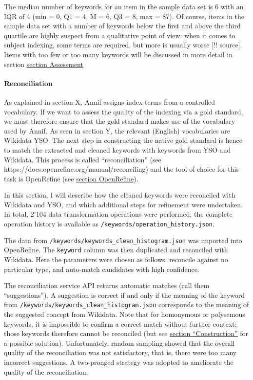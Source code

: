 The median number of keywords for an item in the sample data set is 6
with an IQR of 4 (min = 0, Q1 = 4, M = 6, Q3 = 8, max = 87). Of course,
items in the sample data set with a number of keywords below the first
and above the third quartile are highly suspect from a qualitative point
of view: when it comes to subject indexing, some terms are required, but
more is usually worse {[}!! source{]}. Items with too few or too many
keywords will be discussed in more detail in section
\protect\hyperlink{assessment}{section Assessment}

\hypertarget{reconciliation}{%
\paragraph{Reconciliation}\label{reconciliation}}

As explained in section X, Annif assigns index terms from a controlled
vocabulary. If we want to assess the quality of the indexing via a gold
standard, we must therefore ensure that the gold standard makes use of
the vocabulary used by Annif. As seen in section Y, the relevant
(English) vocabularies are Wikidata YSO. The next step in constructing
the native gold standard is hence to match the extracted and cleaned
keywords with keywords from YSO and Wikidata. This process is called
``reconciliation'' (see https://docs.openrefine.org/manual/reconciling)
and the tool of choice for this task is OpenRefine (see
\protect\hyperlink{openrefine}{section OpenRefine}).

In this section, I will describe how the cleaned keywords were
reconciled with Wikidata and YSO, and which additional steps for
refinement were undertaken. In total, 2'104 data transformation
operations were performed; the complete operation history is available
as \texttt{/keywords/operation\_history.json}.

The data from \texttt{/keywords/keywords\_clean\_histogram.json} was
imported into OpenRefine. The \texttt{keyword} column was then
duplicated and reconciled with Wikidata. Here the parameters were chosen
as follows: reconcile against no particular type, and auto-match
candidates with high confidence.

The reconciliation service API returns automatic matches (call them
``suggestions''). A suggestion is correct if and only if the meaning of
the keyword from \texttt{/keywords/keywords\_clean\_histogram.json}
corresponds to the meaning of the suggested concept from Wikidata. Note
that for homonymous or polysemous keywords, it is impossible to confirm
a correct match without further context; those keywords therefore cannot
be reconciled (but see \protect\hyperlink{construction}{section
``Construction''} for a possible solution). Unfortunately, random
sampling showed that the overall quality of the reconciliation was not
satisfactory, that is, there were too many incorrect suggestions. A
two-pronged strategy was adopted to ameliorate the quality of the
reconciliation.

